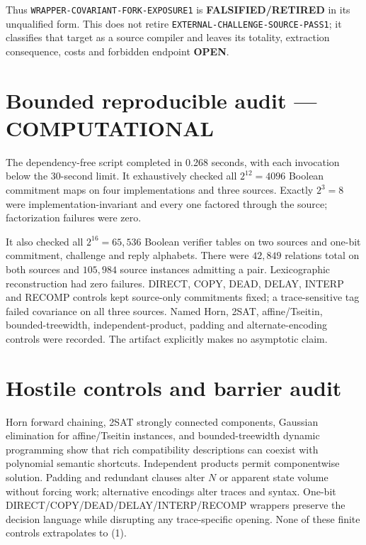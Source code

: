 \documentclass[11pt]{article}
\newcommand{\COMP}{\textbf{COMPUTATIONAL}}
\newcommand{\OPEN}{\textbf{OPEN}}
\newcommand{\RETIRED}{\textbf{FALSIFIED/RETIRED}}
\begin{document}
Thus \texttt{WRAPPER-COVARIANT-FORK-EXPOSURE1} is \RETIRED{} in its
unqualified form.  This does not retire
\texttt{EXTERNAL-CHALLENGE-SOURCE-PASS1}; it classifies that target as a
source compiler and leaves its totality, extraction consequence, costs and
forbidden endpoint \OPEN.

\section{Bounded reproducible audit --- \COMP}

The dependency-free script
 completed in
0.268 seconds, with each invocation below the 30-second limit.  It exhaustively
checked all $2^{12}=4096$ Boolean commitment maps on four implementations and
three sources.  Exactly $2^3=8$ were implementation-invariant and every one
factored through the source; factorization failures were zero.

It also checked all $2^{16}=65{,}536$ Boolean verifier tables on two sources
and one-bit commitment, challenge and reply alphabets.  There were $42{,}849$
relations total on both sources and $105{,}984$ source instances admitting a
pair.  Lexicographic reconstruction had zero failures.  DIRECT, COPY, DEAD,
DELAY, INTERP and RECOMP controls kept source-only commitments fixed; a
trace-sensitive tag failed covariance on all three sources.  Named Horn,
2SAT, affine/Tseitin, bounded-treewidth, independent-product, padding and
alternate-encoding controls were recorded.  The artifact
explicitly makes no asymptotic claim.

\section{Hostile controls and barrier audit}

Horn forward chaining, 2SAT strongly connected components, Gaussian
elimination for affine/Tseitin instances, and bounded-treewidth dynamic
programming show that rich compatibility descriptions can coexist with
polynomial semantic shortcuts.  Independent products permit componentwise
solution.  Padding and redundant clauses alter $N$ or apparent state volume
without forcing work; alternative encodings alter traces and syntax.
One-bit DIRECT/COPY/DEAD/DELAY/INTERP/RECOMP wrappers preserve the decision
language while disrupting any trace-specific opening.  None of these finite
controls extrapolates to (1).
\end{document}
